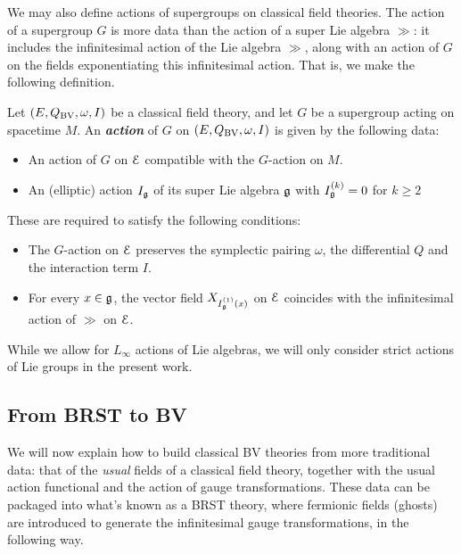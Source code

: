 \documentclass[10pt, oneside]{article}
\newcommand{\defterm}[1]{\textbf{\emph{#1}}}
\begin{document}
We may also define actions of supergroups on classical field theories.  The action of a supergroup $G$ is more data than the action of a super Lie algebra $\gg$: it includes the infinitesimal action of the Lie algebra $\gg$, along with an action of $G$ on the fields exponentiating this infinitesimal action.  That is, we make the following definition.

\begin{definition}
\label{group_action_def}
Let $(E, Q_{\mathrm{BV}}, \omega, I)$ be a classical field theory, and let $G$ be a supergroup acting on spacetime $M$. An \defterm{action} of $G$ on $(E, Q_{\mathrm{BV}}, \omega, I)$ is given by the following data:
\begin{itemize}
\item An action of $G$ on $\mathcal E$ compatible with the $G$-action on $M$.

\item An (elliptic) action $I_\mathfrak g$ of its super Lie algebra $\mathfrak g$ with $I^{(k)}_\mathfrak g = 0$ for $k\geq 2$ 
\end{itemize}
These are required to satisfy the following conditions:
\begin{itemize}
\item The $G$-action on $\mathcal E$ preserves the symplectic pairing $\omega$, the differential $Q$ and the interaction term $I$.

\item For every $x\in\mathfrak g$, the vector field $X_{{I^{(1)}_\mathfrak g}(x)}$ on $\mathcal E$ coincides with the infinitesimal action of $\gg$ on $\mathcal E$.
\end{itemize}
\end{definition}

\begin{remark}
While we allow for $L_\infty$ actions of Lie algebras, we will only consider strict actions of Lie groups in the present work.
\end{remark}

\subsection{From BRST to BV}
We will now explain how to build classical BV theories from more traditional data: that of the \emph{usual} fields of a classical field theory, together with the usual action functional and the action of gauge transformations.  These data can be packaged into what's known as a BRST theory, where fermionic fields (ghosts) are introduced to generate the infinitesimal gauge transformations, in the following way.
\end{document}

